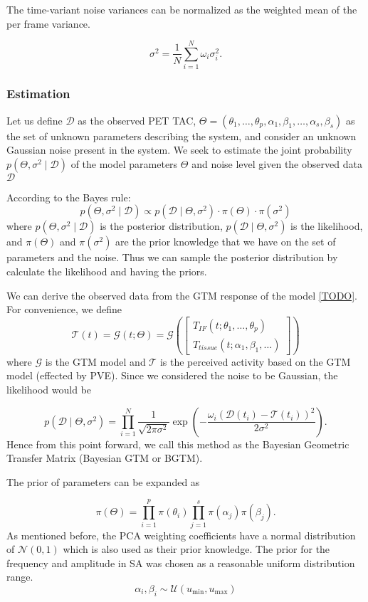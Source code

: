 The time-variant noise variances can be normalized as the weighted mean of the per frame variance.

\[
	\sigma^2= \frac{1}{N} \sum_{i=1}^{N} \omega_i \sigma_i^2.
\]


\subsubsection{Estimation}
Let us define  \(\mathcal{D}\) as the observed PET TAC, \( \Theta = (\theta_{1}, \dots,\theta_{p}, \alpha_{1}, \beta_{1}, \dots, \alpha_{s}, \beta_{s}) \) as the set of unknown parameters describing the system, and consider an unknown Gaussian noise present in the system. We seek to estimate the joint probability \(p(\Theta,\sigma^2\mid \mathcal{D})\) of the model parameters \(\Theta\) and noise level given the observed data \(\mathcal{D}\)

According to the Bayes rule:
\[
	p(\Theta,\sigma^2 \mid \mathcal{D}) \propto p(\mathcal{D} \mid \Theta,\sigma^2) \cdot \pi( \Theta ) \cdot \pi( \sigma^2)
\]
where  \(p(\Theta,\sigma^2 \mid \mathcal{D})\) is the posterior distribution, \(p(\mathcal{D} \mid \Theta,\sigma^2)\) is the likelihood, and $\pi(\Theta)$ and $\pi(\sigma^2)$ are the prior knowledge that we have on the set of parameters and the noise. Thus we can sample the posterior distribution by calculate the likelihood and having the priors.


We can derive the observed data from the GTM response of the model \ref{TODO}. For convenience, we define
\[
	\mathcal{T}(t) = \mathcal{G}(t;\Theta) =
	\mathcal{G}\left(
	\begin{bmatrix}
			T_{IF}(t;\theta_{1}, \dots, \theta_{p}) \\
			T_{tissue}(t;\alpha_{1}, \beta_{1}, \dots)
		\end{bmatrix}\right)
\]
where $\mathcal{G}$ is the GTM model and $\mathcal{T}$ is the perceived activity based on the GTM model (effected by PVE). Since we considered the noise to be Gaussian, the likelihood would be

\[
	p(\mathcal{D} \mid \Theta,\sigma^2) = \prod_{i=1}^N \frac{1}{\sqrt{2\pi \sigma^2}} \exp\left( -\frac{\omega_i(\mathcal{D}(t_i) - \mathcal{T}(t_i))^2}{2\sigma^2} \right).
\]
Hence from this point forward, we call this method as the Bayesian Geometric Transfer Matrix (Bayesian GTM or BGTM).

The prior of parameters can be expanded as

\[
	\pi(\Theta) = \prod_{i=1}^p \pi(\theta_i)  \prod_{j=1}^s \pi(\alpha_j) \pi(\beta_j).
\]
As mentioned before, the PCA weighting coefficients have a normal distribution of $\mathcal{N}(0,1)$ which is also used as their prior knowledge.
The prior for the frequency and amplitude in SA was chosen as a reasonable uniform distribution range.
\[
	\alpha_i,\beta_i \sim \mathcal{U}( u_{\text{min}} , u_{\text{max}} )
\]

